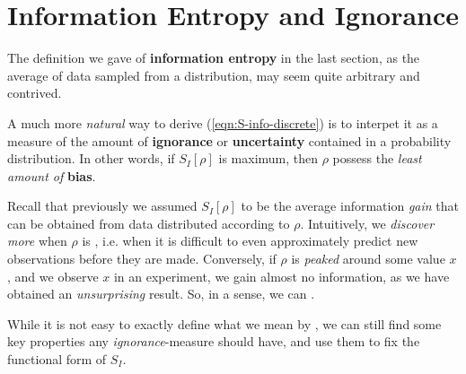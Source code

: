 \documentclass[../../main.tex]{subfiles}
\begin{document}


\section{Information Entropy and Ignorance}
The definition we gave of \textbf{information entropy} in the last section, as the average  of data sampled from a distribution, may seem quite arbitrary and contrived.

\medskip

A much more \textit{natural} way to derive (\ref{eqn:S-info-discrete}) is to interpet it as a measure of the amount of \textbf{ignorance} or \textbf{uncertainty} contained in a probability distribution. In other words, if $S_I[\rho]$ is maximum, then $\rho$ possess the \textit{least amount of} \textbf{bias}.  

\medskip

Recall that previously we assumed $S_I[\rho]$ to be the average information \textit{gain} that can be obtained from data distributed according to $\rho$. Intuitively, we \textit{discover more} when $\rho$ is , i.e. when it is difficult to even approximately predict new observations before they are made. Conversely, if $\rho$ is \textit{peaked} around some value $x$, and we observe $x$ in an experiment, we gain almost no  information, as we have obtained an \textit{unsurprising} result. So, in a sense, we can . 

\medskip

While it is not easy to exactly define what we mean by , we can still find some key properties any \textit{ignorance}-measure should have, and use them to fix the functional form of $S_I$.

\medskip
\end{document}
